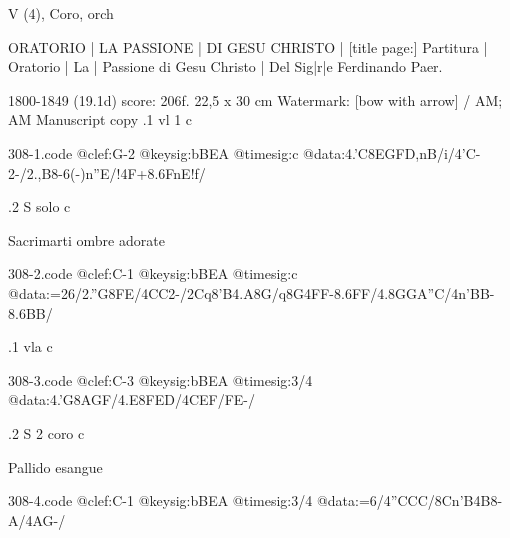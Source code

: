 \documentclass[twocolumn]{book}
\begin{document}
\newline V (4), Coro, orch
\newline \begin{itshape} ORATORIO | LA PASSIONE | DI GESU CHRISTO | [title page:] Partitura | Oratorio | La | Passione di Gesu Christo | Del Sig|r|e Ferdinando Paer.\end{itshape} 
\newline \textcolor{darkblue}{}  1800-1849 (19.1d)  score: 206f.  22,5 x 30 cm
\newline Watermark: [bow with arrow] / AM; AM
\newline Manuscript copy
.1  vl 1  c  
\begin{filecontents*}{308-1.code}
@clef:G-2
@keysig:bBEA
@timesig:c
@data:4.'C8E{GFD,nB}/i/4'C-2-/2.,B8-6(-)n''E/!4F+{8.6FnE}!f/
\end{filecontents*}
\newline
%

.2  S solo  c
\newline \begin{footnotesize} Sacrimarti ombre adorate \end{footnotesize}  
\begin{filecontents*}{308-2.code}
@clef:C-1
@keysig:bBEA
@timesig:c
@data:=26/2.''G{8FE}/4CC2-/2Cq8'B4.A8G/q8G4FF-8.6FF/4.8GGA''C/4n'BB-8.6BB/
\end{filecontents*}
\newline
%

.1  vla  c  
\begin{filecontents*}{308-3.code}
@clef:C-3
@keysig:bBEA
@timesig:3/4
@data:4.'G{8AGF}/4.E{8FED}/4CEF/FE-/
\end{filecontents*}
\newline
%

.2  S 2 coro  c
\newline \begin{footnotesize} Pallido esangue \end{footnotesize}  
\begin{filecontents*}{308-4.code}
@clef:C-1
@keysig:bBEA
@timesig:3/4
@data:=6/4''CCC/{8Cn'B}4B8-A/4AG-/
\end{filecontents*}
\newline
%
\end{document}
